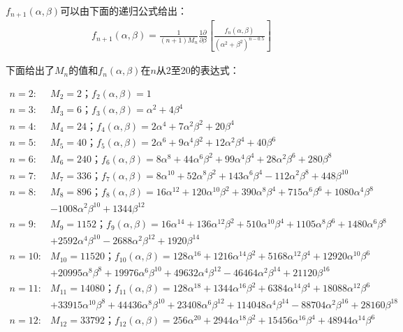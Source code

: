 $f_{n+1}(\alpha,\beta)$可以由下面的递归公式给出：
\begin{align*}
f_{n+1}(\alpha,\beta)=\frac{1}{(n+1)M_n }\frac{1\partial}{\partial\beta}\left[\frac{f_n(\alpha,\beta)}{(\alpha^2+\beta^2)^{n-0.5}}\right] 
\end{align*}

下面给出了$M_n$的值和$f_{n}(\alpha,\beta)$在$n$从2至20的表达式：
\begin{flushleft}
\begin{align*}
n=2:&M_2=2；f_2(\alpha,\beta)=1 \\
n=3:&M_3=6；f_3(\alpha,\beta)=\alpha^2+4\beta^4 \\ 
n=4:&M_4=24；f_4(\alpha,\beta)=2\alpha^4+7\alpha^2\beta^2+20\beta^4 \\ 
n=5:&M_5=40；f_5(\alpha,\beta)=2\alpha^6+9\alpha^4\beta^2+12\alpha^2\beta^4+40\beta^6 \\ 
n=6:&M_6=240；f_6(\alpha,\beta)=8\alpha^8+44\alpha^6\beta^2+99\alpha^4\beta^4+28\alpha^2\beta^6+280\beta^8 \\ 
n=7:&M_7=336；f_7(\alpha,\beta)=8\alpha^{10}+52\alpha^8\beta^2+143\alpha^6\beta^4-112\alpha^2\beta^8+448\beta^{10} \\ 
n=8:&M_8=896；f_8(\alpha,\beta)=16\alpha^{12}+120\alpha^{10}\beta^2+390\alpha^8\beta^4+715\alpha^6\beta^6+1080\alpha^4\beta^8\\ &-1008\alpha^2\beta^{10}+1344\beta^{12}\\
n=9:&M_9=1152；f_9(\alpha,\beta)=16\alpha^{14}+136\alpha^{12}\beta^2+510\alpha^{10}\beta^4+1105\alpha^8\beta^6+1480\alpha^6\beta^8\\ &+2592\alpha^4\beta^{10}-2688\alpha^2\beta^{12}+1920\beta^{14}\\
n=10:&M_{10}=11520；f_{10}(\alpha,\beta)=128\alpha^{16}+1216\alpha^{14}\beta^2+5168\alpha^{12}\beta^4+12920\alpha^{10}\beta^6\\ &+20995\alpha^8\beta^{8}+19976\alpha^6\beta^{10}+49632\alpha^4\beta^{12}-46464\alpha^2\beta^{14}+21120\beta^{16} \\ 
n=11:&M_{11}=14080；f_{11}(\alpha,\beta)=128\alpha^{18}+1344\alpha^{16}\beta^2+6384\alpha^{14}\beta^4+18088\alpha^{12}\beta^6\\ 
&+33915\alpha^{10}\beta^{8}+44436\alpha^8\beta^{10}+23408\alpha^6\beta^{12}+114048\alpha^4\beta^{14}-88704\alpha^2\beta^{16}+28160\beta^{18}\\
n=12:&M_{12}=33792；f_{12}(\alpha,\beta)=256\alpha^{20}+2944\alpha^{18}\beta^2+15456\alpha^{16}\beta^4+48944\alpha^{14}\beta^6\\ 

\end{align*}
\end{flushleft}
